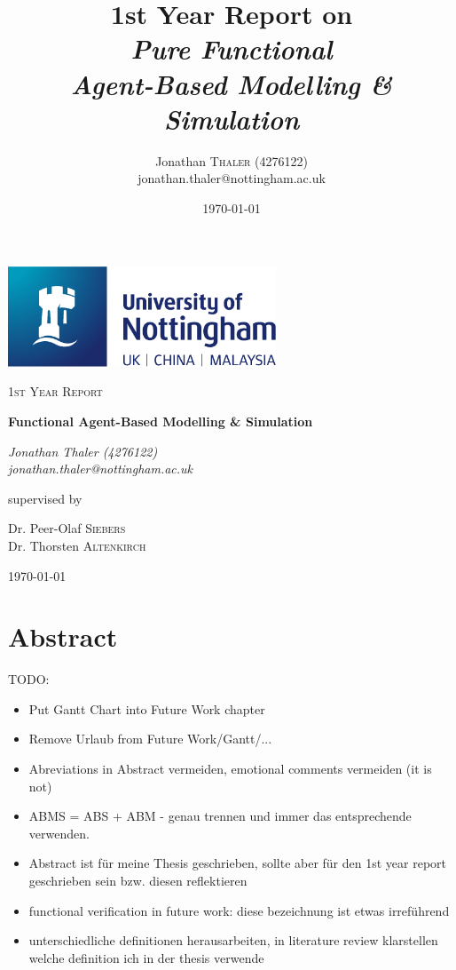 \documentclass[oneside]{book}
\title{\small{1st Year Report on} \\ \textit{Pure Functional \\ Agent-Based Modelling \& Simulation}} %
\author{Jonathan \textsc{Thaler} (4276122) \\ jonathan.thaler@nottingham.ac.uk } %
\date{\today} %
\begin{document}

\begin{titlepage}
	\centering
	\includegraphics[width=0.60\textwidth]{./logo/UoN_Primary_Logo_RGB.png}\par\vspace{1cm}
	{\scshape\Large 1st Year Report\par}
	\vspace{1.5cm}
	{\huge\bfseries Functional Agent-Based Modelling \& Simulation\par}
	\vspace{2cm}
	{\Large\itshape Jonathan Thaler (4276122) \\ jonathan.thaler@nottingham.ac.uk \par}
	\vfill
	supervised by\par
	Dr. Peer-Olaf \textsc{Siebers} \\
	Dr. Thorsten \textsc{Altenkirch}

	\vfill

	{\large \today\par}
\end{titlepage}


\cleardoublepage
\section*{Abstract}

TODO:
\begin{itemize}
	\item Put Gantt Chart into Future Work chapter
	\item Remove Urlaub from Future Work/Gantt/...
	\item Abreviations in Abstract vermeiden, emotional comments vermeiden (it is not)
	\item ABMS = ABS + ABM - genau trennen und immer das entsprechende verwenden.
	\item Abstract ist für meine Thesis geschrieben, sollte aber für den 1st year report geschrieben sein bzw. diesen reflektieren
	\item functional verification in future work: diese bezeichnung ist etwas irreführend
	\item unterschiedliche definitionen herausarbeiten, in literature review klarstellen welche definition ich in der thesis verwende
\end{itemize}
\end{document}
